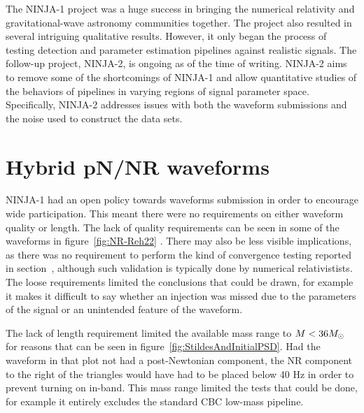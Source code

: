 The NINJA-1 project was a huge success in bringing the numerical
relativity and gravitational-wave astronomy communities together.  The
project also resulted in several intriguing qualitative results.
However, it only began the process of testing detection and parameter
estimation pipelines against realistic signals.  The follow-up
project, NINJA-2, is ongoing as of the time of writing.  NINJA-2 aims
to remove some of the shortcomings of NINJA-1 and allow quantitative
studies of the behaviors of pipelines in varying regions of signal
parameter space.  Specifically, NINJA-2 addresses issues with both the
waveform submissions and the noise used to construct the data sets.

\section{Hybrid pN/NR waveforms}

NINJA-1 had an open policy towards waveforms submission in order to
encourage wide participation.  This meant there were no requirements
on either waveform quality or length.  The lack of quality
requirements can be seen in some of the waveforms in
figure~\ref{fig:NR-Reh22} .  There may also be less visible
implications, as there was no requirement to perform the kind of
convergence testing reported in
section~\cite{sec:PNNRHybridWaveform}, although such validation is
typically done by numerical relativistists.  The loose requirements
limited the conclusions that could be drawn, for example it makes it
difficult to say whether an injection was missed due to the parameters
of the signal or an unintended feature of the waveform.

The lack of length requirement limited the available mass range to $M
< 36 M_\odot$ for reasons that can be seen in
figure~\ref{fig:StildesAndInitialPSD}.   Had the waveform in that plot
not had a post-Newtonian component, the NR component to the right of
the triangles would have had to be placed below 40 Hz in order to
prevent turning on in-band.  This mass range limited the tests that
could be done, for example it entirely excludes the standard CBC
low-mass pipeline.

